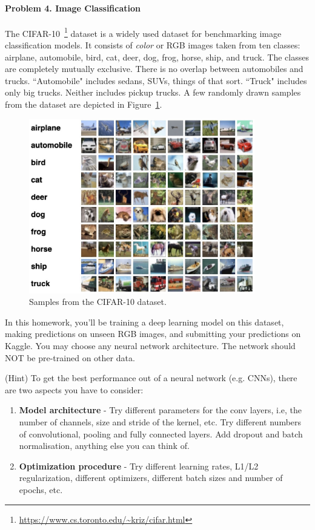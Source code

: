 \documentclass[11pt]{article}\pagestyle{plain}
\begin{document}
\paragraph{Problem 4. Image Classification}

The CIFAR-10~\footnote{\url{https://www.cs.toronto.edu/~kriz/cifar.html}} dataset is a widely used dataset for benchmarking image classification models. It consists of \textit{color} or RGB images taken from ten classes: airplane, automobile, bird, cat, deer, dog, frog, horse, ship, and truck. The classes are completely mutually exclusive. There is no overlap between automobiles and trucks. ``Automobile" includes sedans, SUVs, things of that sort. ``Truck" includes only big trucks. Neither includes pickup trucks. A few randomly drawn samples from the dataset are depicted in Figure~\ref{fig1}.

\begin{figure}[h]
	\centering
	\includegraphics[height=3in]{CIFAR-10.jpg}
	\caption{Samples from the CIFAR-10 dataset.}
	\label{fig1}
\end{figure}

In this homework, you'll be training a deep learning model on this dataset, making predictions on unseen RGB images, and submitting your predictions on Kaggle. 
You may choose any neural network architecture. The network should NOT be pre-trained on other data. 


(Hint) To get the best performance out of a neural network (e.g. CNNs), there are two aspects you have to consider:
\begin{enumerate}
	\item \textbf{Model architecture} - Try different parameters for the conv layers, i.e, the number of channels, size and stride of the kernel, etc. Try different numbers of convolutional, pooling and fully connected layers. Add dropout and batch normalisation, anything else you can think of.
	\item \textbf{Optimization procedure} - Try different learning rates, L1/L2 regularization, different optimizers, different batch sizes and number of epochs, etc. 
\end{enumerate}
\end{document}
